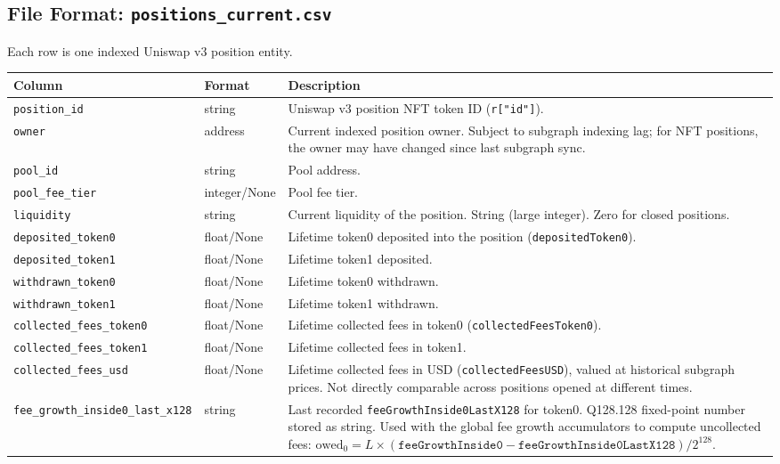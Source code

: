 \documentclass[11pt,a4paper]{article}
\begin{document}
\subsection{File Format: \texttt{positions\_current.csv}}

Each row is one indexed Uniswap v3 position entity.

\begin{xltabular}{\linewidth}{L{4.8cm}L{3.0cm}Y}
\toprule
\textbf{Column} & \textbf{Format} & \textbf{Description} \\
\midrule
\texttt{position\_id} & string & Uniswap v3 position NFT token ID
  (\texttt{r["id"]}). \\
\texttt{owner} & address & Current indexed position owner. Subject to
  subgraph indexing lag; for NFT positions, the owner may have changed
  since last subgraph sync. \\
\texttt{pool\_id} & string & Pool address. \\
\texttt{pool\_fee\_tier} & integer/None & Pool fee tier. \\
\texttt{liquidity} & string & Current liquidity of the position. String
  (large integer). Zero for closed positions. \\
\texttt{deposited\_token0} & float/None & Lifetime token0 deposited into
  the position (\texttt{depositedToken0}). \\
\texttt{deposited\_token1} & float/None & Lifetime token1 deposited. \\
\texttt{withdrawn\_token0} & float/None & Lifetime token0 withdrawn. \\
\texttt{withdrawn\_token1} & float/None & Lifetime token1 withdrawn. \\
\texttt{collected\_fees\_token0} & float/None & Lifetime collected fees
  in token0 (\texttt{collectedFeesToken0}). \\
\texttt{collected\_fees\_token1} & float/None & Lifetime collected fees
  in token1. \\
\texttt{collected\_fees\_usd} & float/None & Lifetime collected fees in
  USD (\texttt{collectedFeesUSD}), valued at historical subgraph prices.
  Not directly comparable across positions opened at different times. \\
\texttt{fee\_growth\_inside0\_last\_x128} & string & Last recorded
  \texttt{feeGrowthInside0LastX128} for token0. Q128.128 fixed-point
  number stored as string. Used with the global fee growth accumulators
  to compute uncollected fees:
  $\text{owed}_0 = L \times (\texttt{feeGrowthInside0} -
  \texttt{feeGrowthInside0LastX128}) / 2^{128}$. \\

\end{xltabular}
\end{document}
